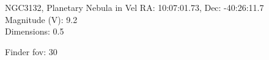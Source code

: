 \begin{block}{NGC3132, Planetary Nebula in Vel}
    RA: 10:07:01.73, Dec: -40:26:11.7 \\ 
    Magnitude (V): 9.2 \\ 
    Dimensions: 0.5 

    Finder fov: 30 
\end{block}
